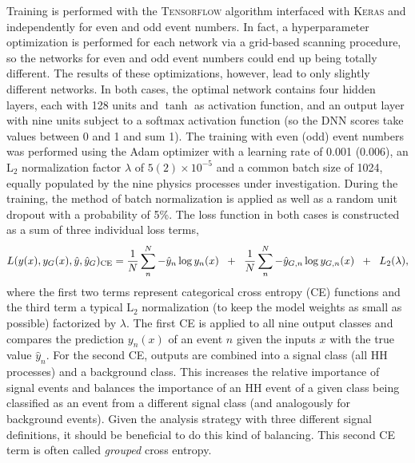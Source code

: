 \documentclass[../main.tex]{subfiles}
\begin{document}
Training is performed with the \textsc{Tensorflow} \cite{hh:analysis:tensorflow} algorithm interfaced with \textsc{Keras} \cite{hh:analysis:keras} and independently for even and odd event numbers. In fact, a hyperparameter optimization is performed for each network via a grid-based scanning procedure, so the networks for even and odd event numbers could end up being totally different. The results of these optimizations, however, lead to only slightly different networks. In both cases, the optimal network contains four hidden layers, each with 128 units and $\tanh$ as activation function, and an output layer with nine units subject to a softmax activation function (so the DNN scores take values between 0 and 1 and sum 1). The training with even (odd) event numbers was performed using the Adam optimizer with a learning rate of 0.001 (0.006), an $\text{L}_2$ normalization factor $\lambda$ of $5(2)\times 10^{-5}$ and a common batch size of 1024, equally populated by the nine physics processes under investigation. During the training, the method of batch normalization is applied as well as a random unit dropout with a probability of 5\%. The loss function in both cases is constructed as a sum of three individual loss terms,
\begin{equation}
 L(y(x), y_G(x), \hat{y}, \hat{y}_G)_\text{CE} = \frac{1}{N} \sum_n^N -\hat{y}_n \log{y_n(x)} \hspace{2mm} + \hspace{2mm} \frac{1}{N} \sum_n^N -\hat{y}_{G,n} \log{y_{G,n}(x)} \hspace{2mm} + \hspace{2mm} L_2(\lambda),
\end{equation}
where the first two terms represent categorical cross entropy (CE) functions and the third term a typical $\text{L}_2$ normalization (to keep the model weights as small as possible) factorized by $\lambda$. The first CE is applied to all nine output classes and compares the prediction $y_n(x)$ of an event $n$ given the inputs $x$ with the true value $\hat{y}_n$. For the second CE, outputs are combined into a signal class (all HH processes) and a background class. This increases the relative importance of signal events and balances the importance of an HH event of a given class being classified as an event from a different signal class (and analogously for background events). Given the analysis strategy with three different signal definitions, it should be beneficial to do this kind of balancing. This second CE term is often called \textit{grouped} cross entropy.
\end{document}
